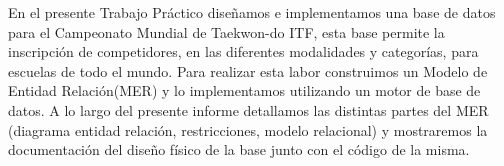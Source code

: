 En el presente Trabajo Práctico diseñamos e implementamos una base de datos para el Campeonato Mundial de Taekwon-do ITF,
esta base permite la inscripción de competidores, en las diferentes modalidades y categorías, para escuelas de todo el mundo.
Para realizar esta labor construimos un Modelo de Entidad Relación(MER) y lo implementamos utilizando un motor de base
de datos. A lo largo del presente informe detallamos las distintas partes del MER (diagrama entidad relación, restricciones,
modelo relacional) y mostraremos la documentación del diseño físico de la base junto con el código de la misma.
